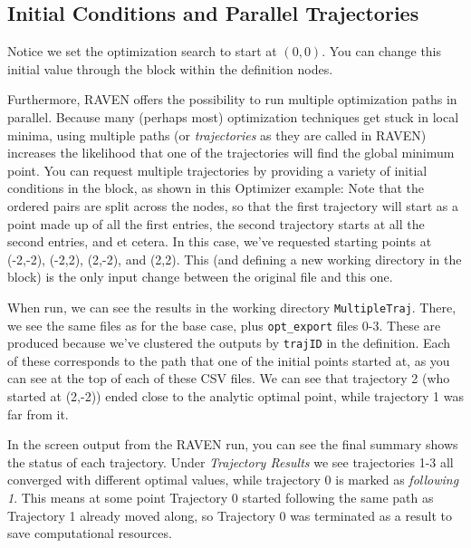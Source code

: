 \subsection{Initial Conditions and Parallel Trajectories} \label{subsec:opt parallel traj}
Notice we set the optimization search to start at $(0,0)$.
You can change this initial value through
the  block within the  definition nodes.

Furthermore, RAVEN offers the possibility to run multiple optimization paths in parallel.  Because many
(perhaps most) optimization techniques get stuck in local minima, using multiple paths (or \emph{trajectories} as
they are called in RAVEN) increases the likelihood that one of the trajectories will find the global minimum
point.  You can request multiple trajectories by providing a variety of initial conditions in the
 block, as shown in this Optimizer example:
Note that the ordered pairs are split across the  nodes, so that the first trajectory will
start as a point made up of all the first entries, the second trajectory starts at all the second entries, and
et cetera.  In this case, we've requested starting points at (-2,-2), (-2,2), (2,-2), and (2,2).  This (and
defining a new working directory in the  block) is the only input change between the original
file and this one.

When run, we can see the results in the working directory \texttt{MultipleTraj}.  There, we see the same files
as for the base case, plus \texttt{opt\_export} files 0-3.  These are produced because we've
clustered the outputs by \texttt{trajID} in the  definition. Each of these corresponds to the
path that one of the initial points started at, as you can see at the top of each of these CSV files.  We can
see that trajectory 2 (who started at (2,-2)) ended close to the analytic optimal point, while trajectory 1
was far from it.

In the screen output from the RAVEN run, you can see the final summary shows the status of each
trajectory. Under \emph{Trajectory Results} we see trajectories 1-3 all converged with different
optimal values, while trajectory 0 is marked as \emph{following 1}. This means at some point
Trajectory 0 started following the same path as Trajectory 1 already moved along, so Trajectory 0
was terminated as a result to save computational resources.

